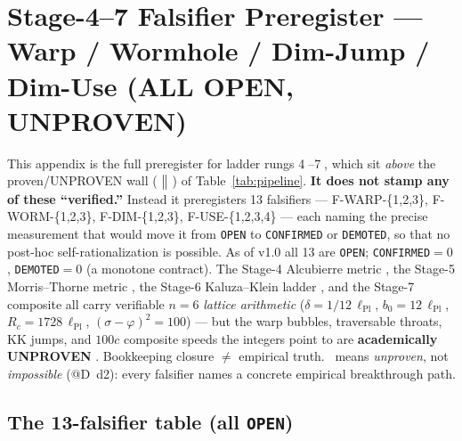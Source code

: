 \section{Stage-4--7 Falsifier Preregister --- Warp / Wormhole / Dim-Jump / Dim-Use (ALL OPEN, UNPROVEN)}
\label{app:stage47}

This appendix is the full preregister for ladder rungs
\textcircled{\scriptsize 4}--\textcircled{\scriptsize 7}, which sit
\emph{above} the proven/UNPROVEN wall ($\;\big\Vert\;$) of
Table~\ref{tab:pipeline}. \textbf{It does not stamp any of these
``verified.''} Instead it preregisters 13 falsifiers ---
F-WARP-\{1,2,3\}, F-WORM-\{1,2,3\}, F-DIM-\{1,2,3\}, F-USE-\{1,2,3,4\}
--- each naming the precise measurement that would move it from
\texttt{OPEN} to \texttt{CONFIRMED} or \texttt{DEMOTED}, so that no
post-hoc self-rationalization is possible. As of v1.0 all 13 are
\texttt{OPEN}; \texttt{CONFIRMED}$=0$, \texttt{DEMOTED}$=0$ (a monotone
contract). The Stage-4 Alcubierre metric \citep{alcubierre1994}, the
Stage-5 Morris--Thorne metric \citep{morristhorne1988}, the Stage-6
Kaluza--Klein ladder \citep{kaluza1921,klein1926}, and the Stage-7
composite all carry verifiable $n\!=\!6$ \emph{lattice arithmetic}
($\delta=1/12\,\ell_{\text{Pl}}$, $b_0=12\,\ell_{\text{Pl}}$,
$R_c=1728\,\ell_{\text{Pl}}$, $(\sigma\!-\!\varphi)^2=100$) --- but the
warp bubbles, traversable throats, KK jumps, and $100c$ composite speeds
the integers point to are \textbf{academically UNPROVEN}
\citep{pfenningford1997,fordroman1995,hawking1992}. Bookkeeping closure
$\ne$ empirical truth. \tierWhite\ means \emph{unproven}, not
\emph{impossible} (@D~d2): every falsifier names a concrete empirical
breakthrough path.

\subsection{The 13-falsifier table (all \texttt{OPEN})}
\label{app:s47-table}

